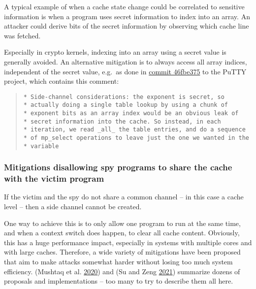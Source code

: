 \documentclass[a4paper,]{report}
\begin{document}
A typical example of when a cache state change could be correlated to
sensitive information is when a program uses secret information to index
into an array. An attacker could derive bits of the secret information
by observing which cache line was fetched.

Especially in crypto kernels, indexing into an array using a secret
value is generally avoided. An alternative mitigation is to always
access all array indices, independent of the secret value, e.g.~as done
in
\href{https://git.tartarus.org/?p=simon/putty.git;a=commitdiff;h=46fbe375bf}{commit
46fbe375} to the PuTTY project, which contains this comment:

\begin{quote}
\begin{verbatim}
* Side-channel considerations: the exponent is secret, so
* actually doing a single table lookup by using a chunk of
* exponent bits as an array index would be an obvious leak of
* secret information into the cache. So instead, in each
* iteration, we read _all_ the table entries, and do a sequence
* of mp_select operations to leave just the one we wanted in the
* variable
\end{verbatim}
\end{quote}

\hypertarget{mitigations-disallowing-spy-programs-to-share-the-cache-with-the-victim-program}{%
\subsubsection{Mitigations disallowing spy programs to share the cache
with the victim
program}\label{mitigations-disallowing-spy-programs-to-share-the-cache-with-the-victim-program}}

If the victim and the spy do not share a common channel -- in this case
a cache level -- then a side channel cannot be created.

One way to achieve this is to only allow one program to run at the same
time, and when a context switch does happen, to clear all cache content.
Obviously, this has a huge performance impact, especially in systems
with multiple cores and with large caches. Therefore, a wide variety of
mitigations have been proposed that aim to make attacks somewhat harder
without losing too much system efficiency. (Mushtaq et al.
\protect\hyperlink{ref-Mushtaq2020}{2020}) and (Su and Zeng
\protect\hyperlink{ref-Su2021}{2021}) summarize dozens of proposals and
implementations -- too many to try to describe them all here.
\end{document}
